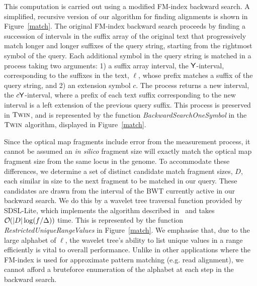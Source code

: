 This computation is carried out using a modified FM-index backward search.
A simplified, recursive version of our algorithm for finding alignments is shown in Figure~\ref{match}.
The original FM-index backward search proceeds by finding a succession of intervals in the suffix array of the original text that progressively match longer and longer suffixes of the query string, starting from the rightmost symbol of the query.   Each additional symbol in the query string is matched in a process taking two arguments: 1) a suffix array interval, the $\mathsf{Y}$-interval, corresponding to the suffixes in the text, $\ell$, whose prefix matches a suffix of the query string, and 2) an extension symbol $c$.  The process returns a new interval, the $c\mathsf{Y}$-interval, where a prefix of each text suffix corresponding to the new interval is a left extension of the previous query suffix. This process is preserved in $\mbox{\rm \textsc{Twin}}$, and is represented by the function \emph{BackwardSearchOneSymbol} in the $\mbox{\rm \textsc{Twin}}$ algorithm, displayed in Figure~\ref{match}.


Since the optical map fragments include error from the measurement process,
it cannot be assumed an \emph{in silico} fragment size will exactly match the optical map fragment size from the same locus in the genome.
To accommodate these differences, we determine a set of distinct candidate match fragment sizes, $D$, each similar in size to the next fragment to be matched in our query. These candidates are drawn from the
interval of the BWT currently active in our backward search.
We do this by a wavelet tree traversal function provided by SDSL-Lite, which implements the algorithm described in~\cite{GNPtcs11} and takes $\bigO(|D|\log(f/\Delta))$ time. This is represented by the function \emph{RestrictedUniqueRangeValues} in Figure~\ref{match}. We emphasise that, due to the large alphabet of $\ell $, the wavelet tree's ability to list unique values in a range efficiently is vital to overall performance. Unlike in other applications where the FM-index is used for approximate pattern matching (e.g. read alignment), we cannot afford a bruteforce enumeration of the alphabet at each step in the backward search.


